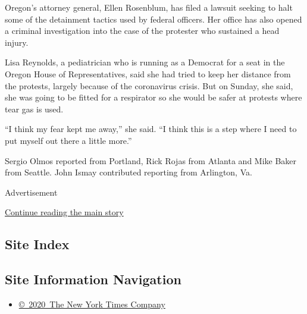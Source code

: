 Oregon's attorney general, Ellen Rosenblum, has filed a lawsuit seeking
to halt some of the detainment tactics used by federal officers. Her
office has also opened a criminal investigation into the case of the
protester who sustained a head injury.

Lisa Reynolds, a pediatrician who is running as a Democrat for a seat in
the Oregon House of Representatives, said she had tried to keep her
distance from the protests, largely because of the coronavirus crisis.
But on Sunday, she said, she was going to be fitted for a respirator so
she would be safer at protests where tear gas is used.

``I think my fear kept me away,'' she said. ``I think this is a step
where I need to put myself out there a little more.''

Sergio Olmos reported from Portland, Rick Rojas from Atlanta and Mike
Baker from Seattle. John Ismay contributed reporting from Arlington, Va.

Advertisement

\protect\hyperlink{after-bottom}{Continue reading the main story}

\hypertarget{site-index}{%
\subsection{Site Index}\label{site-index}}

\hypertarget{site-information-navigation}{%
\subsection{Site Information
Navigation}\label{site-information-navigation}}

\begin{itemize}
\tightlist
\item
  \href{https://help.nytimes3xbfgragh.onion/hc/en-us/articles/115014792127-Copyright-notice}{©~2020~The
  New York Times Company}
\end{itemize}

